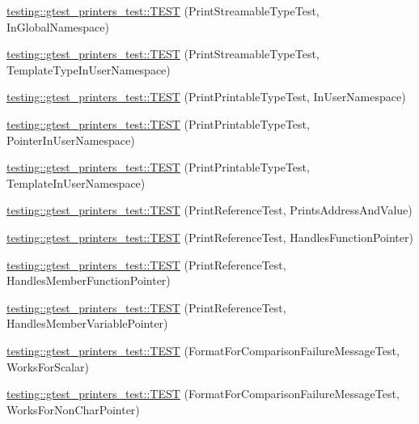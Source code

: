 \begin{DoxyCompactItemize}
\item 
\hyperlink{namespacetesting_1_1gtest__printers__test_a80fe9d71227a97b12fd5336a823c3d17}{testing\+::gtest\+\_\+printers\+\_\+test\+::\+T\+E\+ST} (Print\+Streamable\+Type\+Test, In\+Global\+Namespace)
\item 
\hyperlink{namespacetesting_1_1gtest__printers__test_a8ccd96504d676671a0429073d5012ff1}{testing\+::gtest\+\_\+printers\+\_\+test\+::\+T\+E\+ST} (Print\+Streamable\+Type\+Test, Template\+Type\+In\+User\+Namespace)
\item 
\hyperlink{namespacetesting_1_1gtest__printers__test_a52f5df394111bcc55aecc59ce426088d}{testing\+::gtest\+\_\+printers\+\_\+test\+::\+T\+E\+ST} (Print\+Printable\+Type\+Test, In\+User\+Namespace)
\item 
\hyperlink{namespacetesting_1_1gtest__printers__test_a3da6191eff6b016540024c2bfccdd90b}{testing\+::gtest\+\_\+printers\+\_\+test\+::\+T\+E\+ST} (Print\+Printable\+Type\+Test, Pointer\+In\+User\+Namespace)
\item 
\hyperlink{namespacetesting_1_1gtest__printers__test_aa697a3cf25b7f51f26ab49ed8ac3dd31}{testing\+::gtest\+\_\+printers\+\_\+test\+::\+T\+E\+ST} (Print\+Printable\+Type\+Test, Template\+In\+User\+Namespace)
\item 
\hyperlink{namespacetesting_1_1gtest__printers__test_aeae9b61a9fe582c72580db1466631846}{testing\+::gtest\+\_\+printers\+\_\+test\+::\+T\+E\+ST} (Print\+Reference\+Test, Prints\+Address\+And\+Value)
\item 
\hyperlink{namespacetesting_1_1gtest__printers__test_aab47074bb60b087e80675a44ad8c88ba}{testing\+::gtest\+\_\+printers\+\_\+test\+::\+T\+E\+ST} (Print\+Reference\+Test, Handles\+Function\+Pointer)
\item 
\hyperlink{namespacetesting_1_1gtest__printers__test_a88f9089e0b19be4bda74a953d6a47d7b}{testing\+::gtest\+\_\+printers\+\_\+test\+::\+T\+E\+ST} (Print\+Reference\+Test, Handles\+Member\+Function\+Pointer)
\item 
\hyperlink{namespacetesting_1_1gtest__printers__test_af9c63486049ac0ec2a1db65904702eb3}{testing\+::gtest\+\_\+printers\+\_\+test\+::\+T\+E\+ST} (Print\+Reference\+Test, Handles\+Member\+Variable\+Pointer)
\item 
\hyperlink{namespacetesting_1_1gtest__printers__test_aa7429c3701e464d0047a82686a5e8a46}{testing\+::gtest\+\_\+printers\+\_\+test\+::\+T\+E\+ST} (Format\+For\+Comparison\+Failure\+Message\+Test, Works\+For\+Scalar)
\item 
\hyperlink{namespacetesting_1_1gtest__printers__test_adb093d9323bfb766be8c91215c46056e}{testing\+::gtest\+\_\+printers\+\_\+test\+::\+T\+E\+ST} (Format\+For\+Comparison\+Failure\+Message\+Test, Works\+For\+Non\+Char\+Pointer)

\end{DoxyCompactItemize}
